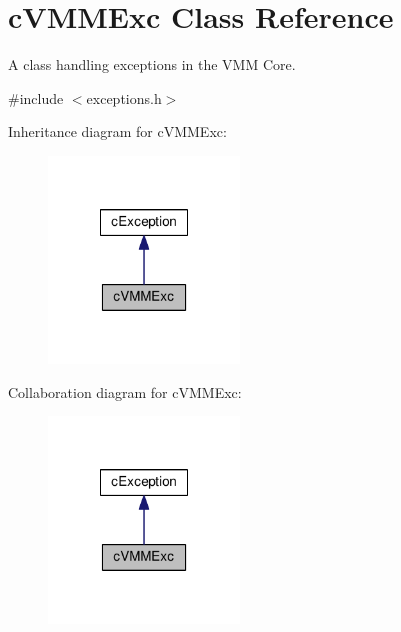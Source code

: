\hypertarget{classcVMMExc}{\section{c\-V\-M\-M\-Exc \-Class \-Reference}
\label{d7/d66/classcVMMExc}
}


\-A class handling exceptions in the \-V\-M\-M \-Core.  




{\ttfamily \#include $<$exceptions.\-h$>$}



\-Inheritance diagram for c\-V\-M\-M\-Exc\-:\nopagebreak
\begin{figure}[H]
\begin{center}
\leavevmode
\includegraphics[width=144pt]{db/da1/classcVMMExc__inherit__graph}
\end{center}
\end{figure}


\-Collaboration diagram for c\-V\-M\-M\-Exc\-:\nopagebreak
\begin{figure}[H]
\begin{center}
\leavevmode
\includegraphics[width=144pt]{d4/d0b/classcVMMExc__coll__graph}
\end{center}
\end{figure}
